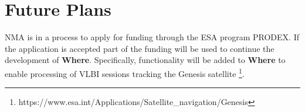 \documentclass[twocolumn,twoside]{svmultivs_br} %
\begin{document}
\section{Future Plans}
%
NMA is in a process to apply for funding through the ESA program PRODEX. If the application is accepted part of the funding
will be used to continue the development of \textbf{Where}. Specifically, functionality will be added to \textbf{Where} to
enable processing of VLBI sessions tracking the Genesis satellite \footnote{https://www.esa.int/Applications/Satellite\_navigation/Genesis}.
%
%
%
%
%
\end{document}
